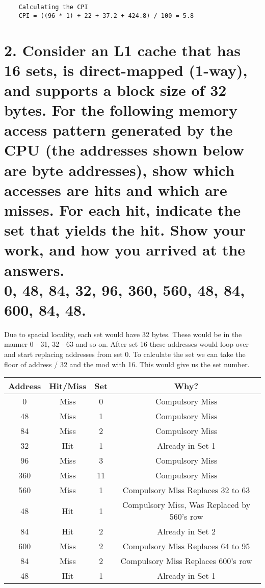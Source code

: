\documentclass[11pt]{article}
\begin{document}
\begin{verbatim}
    Calculating the CPI
    CPI = ((96 * 1) + 22 + 37.2 + 424.8) / 100 = 5.8
\end{verbatim}

\newpage

\section*{2. Consider an L1 cache that has 16 sets, is direct-mapped (1-way), and supports a block size of 32 bytes. For the following memory access pattern generated by the CPU (the addresses shown below are byte addresses), show which accesses are hits and which are misses. For each hit, indicate the set that yields the hit. Show your work, and how you arrived at the answers.\\ 0, 48, 84, 32, 96, 360, 560, 48, 84, 600, 84, 48.}

Due to spacial locality, each set would have 32 bytes. These would be in the manner 0 - 31, 32 - 63 and so on. After set 16 these addresses would loop over and start replacing addresses from set 0. To calculate the set we can take the floor of address / 32 and the mod with 16. This would give us the set number.\\

\begin{tabular}{|c|c|c|c|}
\hline
Address & Hit/Miss & Set & Why?\\
\hline
0 & Miss & 0 & Compulsory Miss\\
\hline
48 & Miss & 1 & Compulsory Miss \\
\hline
84 & Miss & 2 & Compulsory Miss\\
\hline
32 & Hit & 1 & Already in Set 1\\
\hline
96 & Miss & 3 & Compulsory Miss\\
\hline
360 & Miss & 11 & Compulsory Miss\\
\hline
560 & Miss & 1 & Compulsory Miss Replaces 32 to 63\\
\hline
48 & Hit & 1 & Compulsory Miss, Was Replaced by 560's row\\
\hline
84 & Hit & 2 & Already in Set 2\\
\hline
600 & Miss & 2 & Compulsory Miss Replaces 64 to 95\\
\hline
84 & Miss & 2 & Compulsory Miss Replaces 600's row\\
\hline
48 & Hit & 1 & Already in Set 1\\
\hline
\end{tabular}
\end{document}
